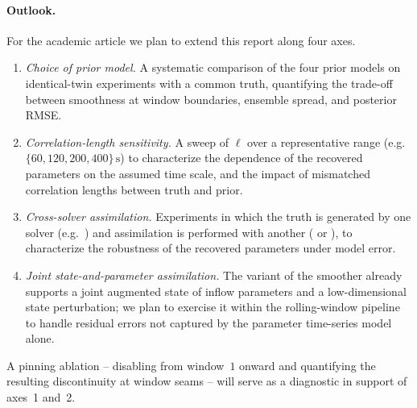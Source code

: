\paragraph{Outlook.}
For the academic article we plan to extend this report along four
axes.
\begin{enumerate}
  \item \emph{Choice of prior model.} A systematic comparison of
        the four prior models on identical-twin experiments with a
        common truth, quantifying the trade-off between smoothness
        at window boundaries, ensemble spread, and posterior RMSE.
  \item \emph{Correlation-length sensitivity.} A sweep of $\ell$ over
        a representative range (e.g.\ $\{60, 120, 200, 400\}\,\mathrm{s}$)
        to characterize the dependence of the recovered parameters
        on the assumed time scale, and the impact of mismatched
        correlation lengths between truth and prior.
  \item \emph{Cross-solver assimilation.} Experiments in which the
        truth is generated by one solver (e.g.\ \pylbm{}) and
        assimilation is performed with another (\pyudales{} or
        \pypalm{}), to characterize the robustness of the recovered
        parameters under model error.
  \item \emph{Joint state-and-parameter assimilation.} The
        \stateparamESMDAclass{} variant of the smoother
        already supports a joint augmented state of inflow
        parameters and a low-dimensional state perturbation; we plan
        to exercise it within the rolling-window pipeline to handle
        residual errors not captured by the parameter time-series
        model alone.
\end{enumerate}
A pinning ablation -- disabling
 from window~$1$ onward and
quantifying the resulting discontinuity at window seams -- will
serve as a diagnostic in support of axes~1 and~2.
